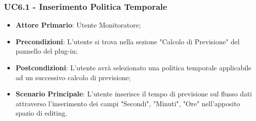 	
	\label{par:UC6.1}
	\subsubsection{UC6.1 - Inserimento Politica Temporale}
		\begin{itemize}
			\item\textbf{Attore Primario}: Utente Monitoratore;
			\item\textbf{Precondizioni}: L'utente si trova nella sezione "Calcolo di Previsione" del pannello del plug-in;
			\item\textbf{Postcondizioni}: L’utente avrà selezionato una politica temporale applicabile ad un successivo calcolo di previsione;
			\item\textbf{Scenario Principale}: L’utente inserisce il tempo di previsione sul flusso dati attraverso l'inserimento dei campi "Secondi", "Minuti", "Ore" nell’apposito spazio di editing.
		\end{itemize}	

	\label{par:UC6.2}

